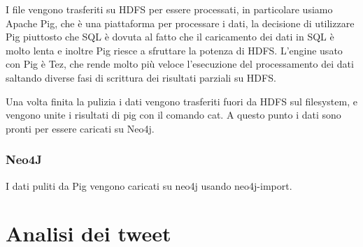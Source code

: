 \documentclass[12pt, a4paper, twocolumn]{article} %
\begin{document}

I file vengono trasferiti su HDFS per essere processati, in particolare usiamo Apache Pig, che è una piattaforma per processare i dati, la decisione di utilizzare Pig piuttosto che SQL è dovuta al fatto che il caricamento dei dati in SQL è molto lenta e inoltre Pig riesce a sfruttare la potenza di HDFS.
L'engine usato con Pig è Tez, che rende molto più veloce l'esecuzione del processamento dei dati saltando diverse fasi di scrittura dei risultati parziali su HDFS.

Una volta finita la pulizia i dati vengono trasferiti fuori da HDFS sul filesystem, e vengono unite i risultati di pig con il comando cat. A questo punto i dati sono pronti per essere caricati su Neo4j.


\section{Neo4J}

I dati puliti da Pig vengono caricati su neo4j usando neo4j-import.

\hfill
\newpage
\part{Analisi dei tweet}
\end{document}
